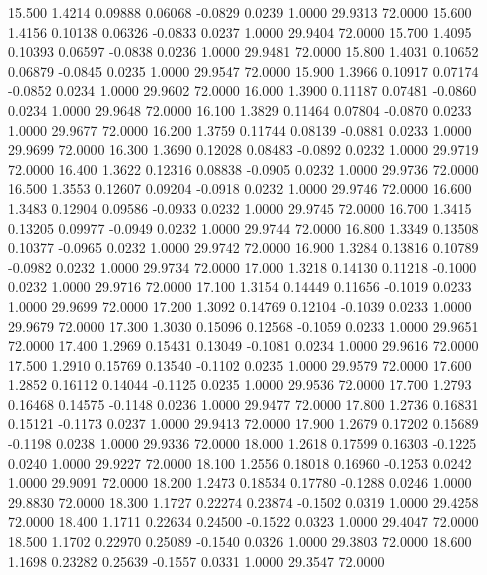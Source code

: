   15.500   1.4214   0.09888   0.06068  -0.0829   0.0239   1.0000  29.9313  72.0000
  15.600   1.4156   0.10138   0.06326  -0.0833   0.0237   1.0000  29.9404  72.0000
  15.700   1.4095   0.10393   0.06597  -0.0838   0.0236   1.0000  29.9481  72.0000
  15.800   1.4031   0.10652   0.06879  -0.0845   0.0235   1.0000  29.9547  72.0000
  15.900   1.3966   0.10917   0.07174  -0.0852   0.0234   1.0000  29.9602  72.0000
  16.000   1.3900   0.11187   0.07481  -0.0860   0.0234   1.0000  29.9648  72.0000
  16.100   1.3829   0.11464   0.07804  -0.0870   0.0233   1.0000  29.9677  72.0000
  16.200   1.3759   0.11744   0.08139  -0.0881   0.0233   1.0000  29.9699  72.0000
  16.300   1.3690   0.12028   0.08483  -0.0892   0.0232   1.0000  29.9719  72.0000
  16.400   1.3622   0.12316   0.08838  -0.0905   0.0232   1.0000  29.9736  72.0000
  16.500   1.3553   0.12607   0.09204  -0.0918   0.0232   1.0000  29.9746  72.0000
  16.600   1.3483   0.12904   0.09586  -0.0933   0.0232   1.0000  29.9745  72.0000
  16.700   1.3415   0.13205   0.09977  -0.0949   0.0232   1.0000  29.9744  72.0000
  16.800   1.3349   0.13508   0.10377  -0.0965   0.0232   1.0000  29.9742  72.0000
  16.900   1.3284   0.13816   0.10789  -0.0982   0.0232   1.0000  29.9734  72.0000
  17.000   1.3218   0.14130   0.11218  -0.1000   0.0232   1.0000  29.9716  72.0000
  17.100   1.3154   0.14449   0.11656  -0.1019   0.0233   1.0000  29.9699  72.0000
  17.200   1.3092   0.14769   0.12104  -0.1039   0.0233   1.0000  29.9679  72.0000
  17.300   1.3030   0.15096   0.12568  -0.1059   0.0233   1.0000  29.9651  72.0000
  17.400   1.2969   0.15431   0.13049  -0.1081   0.0234   1.0000  29.9616  72.0000
  17.500   1.2910   0.15769   0.13540  -0.1102   0.0235   1.0000  29.9579  72.0000
  17.600   1.2852   0.16112   0.14044  -0.1125   0.0235   1.0000  29.9536  72.0000
  17.700   1.2793   0.16468   0.14575  -0.1148   0.0236   1.0000  29.9477  72.0000
  17.800   1.2736   0.16831   0.15121  -0.1173   0.0237   1.0000  29.9413  72.0000
  17.900   1.2679   0.17202   0.15689  -0.1198   0.0238   1.0000  29.9336  72.0000
  18.000   1.2618   0.17599   0.16303  -0.1225   0.0240   1.0000  29.9227  72.0000
  18.100   1.2556   0.18018   0.16960  -0.1253   0.0242   1.0000  29.9091  72.0000
  18.200   1.2473   0.18534   0.17780  -0.1288   0.0246   1.0000  29.8830  72.0000
  18.300   1.1727   0.22274   0.23874  -0.1502   0.0319   1.0000  29.4258  72.0000
  18.400   1.1711   0.22634   0.24500  -0.1522   0.0323   1.0000  29.4047  72.0000
  18.500   1.1702   0.22970   0.25089  -0.1540   0.0326   1.0000  29.3803  72.0000
  18.600   1.1698   0.23282   0.25639  -0.1557   0.0331   1.0000  29.3547  72.0000

